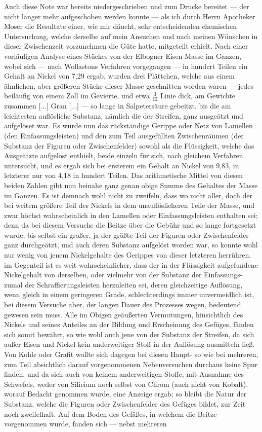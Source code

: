 \documentclass[a4paper, 11pt, oneside, german]{article}
\begin{document}
{Auch diese Note war bereits niedergeschrieben und zum Drucke bereitet --- der nicht länger mehr aufgeschoben werden konnte --- als ich durch Herrn Apotheker Moser die Resultate einer, wie mir däucht, sehr entscheidenden chemischen Untersuchung, welche derselbe auf mein Ansuchen und nach meinen Wünschen in dieser Zwischenzeit vorzunehmen die Güte hatte, mitgeteilt erhielt. Nach einer vorläufigen Analyse eines Stückes von der Elbogner Eisen-Masse im Ganzen, wobei sich --- nach Wollastons Verfahren vorgegangen --- in hundert Teilen ein Gehalt an Nickel von 7,29 ergab, wurden drei Plättchen, welche aus einem ähnlichen, aber größeren Stücke dieser Masse geschnitten worden waren --- jedes beiläufig von einem Zoll im Gevierte, und etwa $\frac{3}{12}$ Linie dick, am Gewichte zusammen [...] Gran [...] --- so lange in Salpetersäure gebeitzt, bis die am leichtesten auflösliche Substanz, nämlich die der Streifen, ganz ausgeätzt und aufgelöset war. Es wurde nun das rückständige Gerippe oder Netz von Lamellen (den Einfassungsleisten) und den zum Teil ausgefüllten Zwischenräumen (der Substanz der Figuren oder Zwischenfelder) sowohl als die Flüssigkeit, welche das Ausgeätzte aufgelöst enthielt, beide einzeln für sich, nach gleichem Verfahren untersucht, und es ergab sich bei ersterem ein Gehalt an Nickel von 9,83, in letzterer nur von 4,18 in hundert Teilen. Das arithmetische Mittel von diesen beiden Zahlen gibt nun beinahe ganz genau obige Summe des Gehaltes der Masse im Ganzen. Es ist demnach wohl nicht zu zweifeln, dass wo nicht aller, doch der bei weitem größere Teil des Nickels in dem unauflöslicheren Teile der Masse, und zwar höchst wahrscheinlich in den Lamellen oder Einfassungsleisten enthalten sei; denn da bei diesem Versuche die Beitze über die Gebühr und so lange fortgesetzt wurde, bis selbst ein großer, ja der größte Teil der Figuren oder Zwischenfelder ganz durchgeätzt, und auch deren Substanz aufgelöst worden war, so konnte wohl nur wenig von jenem Nickelgehalte des Gerippes von dieser letzteren herrühren, im Gegenteil ist es weit wahrscheinlicher, dass der in der Flüssigkeit aufgefundene Nickelgehalt von derselben, oder vielmehr von der Substanz der Einfassungs- zumal der Schraffierungsleisten herzuleiten sei, deren gleichzeitige Auflösung, wenn gleich in einem geringeren Grade, schlechterdings immer unvermeidlich ist, bei diesem Versuche aber, der langen Dauer des Prozesses wegen, bedeutend gewesen sein muss. Alle im Obigen geäußerten Vermutungen, hinsichtlich des Nickels und seines Anteiles an der Bildung und Erscheinung des Gefüges, fänden sich somit bewährt, so wie wohl auch jene von der Substanz der Streifen, da sich außer Eisen und Nickel kein anderweitiger Stoff in der Auflösung ausmitteln ließ. Von Kohle oder Grafit wollte sich dagegen bei diesen Haupt- so wie bei mehreren, zum Teil absichtlich darauf vorgenommenen Nebenversuchen durchaus keine Spur finden, und da sich auch von keinem anderweitigen Stoffe, mit Ausnahme des Schwefels, weder von Silicium noch selbst von Chrom (auch nicht von Kobalt), worauf Bedacht genommen wurde, eine Anzeige ergab; so bleibt die Natur der Substanz, welche die Figuren oder Zwischenfelder des Gefüges bildet, zur Zeit noch zweifelhaft. Auf dem Boden des Gefäßes, in welchem die Beitze vorgenommen wurde, fanden sich --- nebst mehreren }
\end{document}
